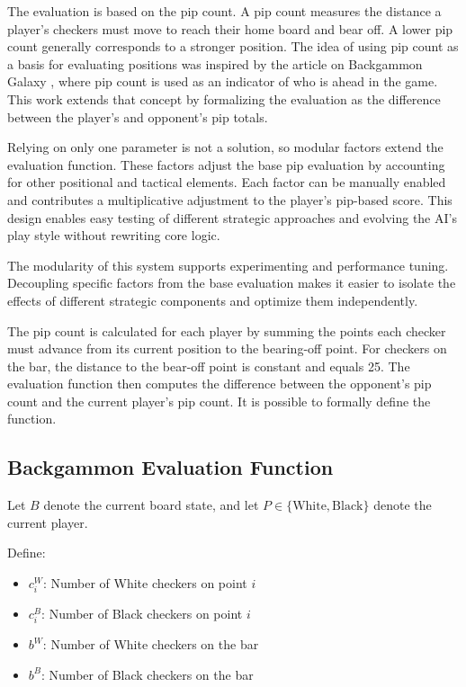 The evaluation is based on the pip count. A pip count measures the distance a player's checkers must
move to reach their home board and bear off. A lower pip count generally corresponds to a stronger position. The idea of using pip count as a basis for evaluating positions was inspired by the article on Backgammon Galaxy \cite{backgammon_galaxy}, where pip count is used as an indicator of who is ahead in the game. This work extends that concept by formalizing the evaluation as the difference between the player's and opponent's pip totals.

Relying on only one parameter is not a solution, so modular factors extend the evaluation function. These factors adjust the base pip evaluation by accounting for other positional and tactical elements. Each factor can be manually enabled and contributes a multiplicative adjustment to the player's pip-based score. This design enables easy testing of different strategic approaches and evolving the AI's play style without rewriting core logic.

The modularity of this system supports experimenting and performance tuning. Decoupling specific factors from the base evaluation makes it easier to isolate the effects of different strategic components and optimize them independently.

The pip count is calculated for each player by summing the points each checker must advance from its current position to the bearing-off point. For checkers on the bar, the distance to the bear-off point is constant and equals 25. The evaluation function then computes the difference between the opponent's pip count and the current player's pip count. It is possible to formally define the function.

\subsection*{Backgammon Evaluation Function}

Let $B$ denote the current board state, and let $P \in \{\text{White}, \text{Black}\}$ denote the current player.

Define:

\begin{itemize}
    \item $c_i^W$: Number of White checkers on point $i$
    \item $c_i^B$: Number of Black checkers on point $i$
    \item $b^W$: Number of White checkers on the bar
    \item $b^B$: Number of Black checkers on the bar
\end{itemize}

